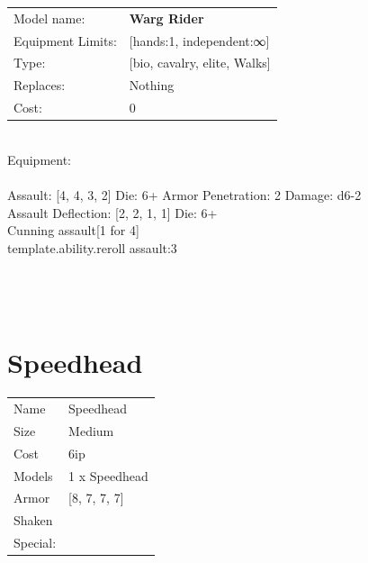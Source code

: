 \noindent
\begin{tabular}{ll}
Model name: &{\bf Warg Rider } \\
Equipment Limits: &[hands:1, independent:∞] \\
Type: &[bio, cavalry, elite, Walks] \\
Replaces: &Nothing \\
Cost: & 0\\
\end{tabular}
\ \\
Equipment:  \\
\ \\
Assault: [4, 4, 3, 2] Die: 6+ Armor Penetration: 2 Damage: d6-2 \\
Assault Deflection: [2, 2, 1, 1] Die: 6+\\
\indent Cunning assault[1 for 4]\\ 
{template.ability.reroll assault:3}\\ 
 
\ \\

\ \\
 
\ \\













\clearpage

\section{ Speedhead }

\begin{tabular}{ll}
  Name & Speedhead \\
  Size & Medium\\
  Cost & 6ip\\
  Models & 1 x Speedhead\\
  Armor & [8, 7, 7, 7]\\
  Shaken & \\
  Special: \\
\end{tabular}

\noindent 

